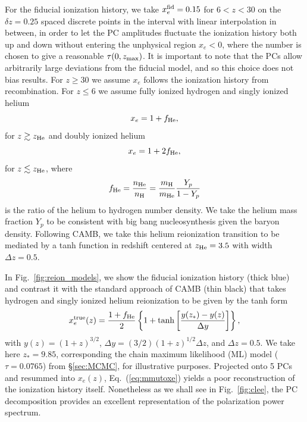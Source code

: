 \documentclass[prd,twocolumn,amsmath,amssymb,floatfix,superscriptaddress,nofootinbib]{revtex4-1}
\newcommand{\xef}{x_e^{\rm fid}}
\newcommand{\beq}{\begin{equation}}
\newcommand{\eeq}{\end{equation}}
\begin{document}
For the fiducial ionization history, we take $\xef=0.15$ for $6<z<30$ on the $\delta z=0.25$ spaced discrete points in the interval with linear interpolation in between,
 in order to let the PC amplitudes
fluctuate the ionization history both up and down without entering the unphysical region 
$x_e <0$,  where the number is chosen to give a reasonable $\tau(0,z_{\rm max})$.  It is important to note that the PCs allow
arbitrarily large deviations from the fiducial model, and so this choice does not bias
results.    For $z\ge 30$ we assume $x_e$ follows the ionization history from
recombination. For $z\le 6$ we  assume fully ionized hydrogen and singly ionized helium
 \begin{equation}
 x_e = 1+ f_{\rm He},
 \end{equation}
 for $z \gtrsim z_{\rm He}$ and doubly ionized helium
  \begin{equation}
x_e =  1+ 2f_{\rm He},
 \end{equation}
for $z \lesssim z_{\rm He}$,
where
\beq
f_{\rm He} = \frac{n_{\rm He}}{n_{\rm H}} = \frac{m_{\rm H}}{m_{\rm He}}\frac{Y_p}{1-Y_p}
\eeq
is the ratio of the helium to hydrogen number density.
We  take the helium mass fraction $Y_p$ to be consistent with big bang nucleosynthesis given the baryon density. 
  Following CAMB, we take this helium reionization transition to be mediated by
 a tanh function in redshift centered at  $z_{\rm He} = 3.5$ \cite{Becker:2010cu} with width $\Delta z=0.5$.

In Fig.~\ref{fig:reion_models}, we show the fiducial ionization history (thick blue) and contrast it with
the standard approach of CAMB (thin black) that takes hydrogen and singly ionized helium reionization to be given by
the tanh form
 \begin{equation}
x_e^{\rm true}(z) = \frac{1+f_{\rm He}}{2}\left\{  1+ \tanh\left[ \frac{y(z_*)-y(z)}{\Delta y} \right] \right\},
 \label{eqn:tanh}
 \end{equation}
 with $y(z)=(1+z)^{3/2}$, $\Delta y=(3/2)(1+z)^{1/2}\Delta z$, and $\Delta z = 0.5$.  We take here $z_*= 9.85$, corresponding the chain maximum likelihood (ML) model ($\tau = 0.0765$) from \S \ref{sec:MCMC},  for illustrative purposes.   Projected onto 5 PCs and resummed into $x_e(z)$, Eq.~(\ref{eq:mmutoxe}) yields a poor reconstruction of the ionization history itself.
 Nonetheless as we shall see in Fig.~\ref{fig:clee}, the PC decomposition provides an 
 excellent representation of the polarization power spectrum.
 
\end{document}
